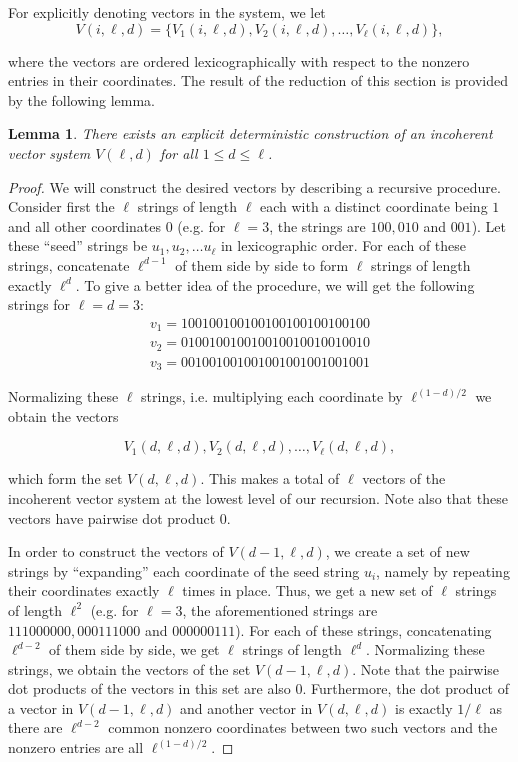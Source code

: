 \documentclass[11pt]{article}
\newtheorem{lem}[thm]{Lemma}
\begin{document}
\noindent For explicitly denoting vectors in the system, we let
$$
V(i,\ell,d) = \{V_1(i,\ell,d), V_2(i,\ell,d), \hdots, V_{\ell}(i,\ell,d)\},
$$

\noindent where the vectors are ordered lexicographically with respect to
the nonzero entries in their coordinates. The result of the
reduction of this section is provided by the following lemma.
\begin{lem}
\label{existence_1} There exists an explicit deterministic
construction of an incoherent vector system $V(\ell, d)$
for all $1 \leq d \leq \ell$.
\end{lem}

\begin{proof}
We will construct the desired vectors by describing a recursive
procedure. Consider first the $\ell$ strings of length $\ell$ each
with a distinct coordinate being $1$ and all other coordinates $0$
(e.g. for $\ell = 3$, the strings are $100, 010$ and $001$). Let
these ``seed'' strings be $u_1, u_2, \hdots u_{\ell}$ in
lexicographic order. For each of these strings, concatenate
$\ell^{d-1}$ of them side by side to form $\ell$ strings of
length exactly $\ell^d$. To give a better idea of the
procedure, we will get the following strings for $\ell = d = 3$:
\begin{eqnarray*}
v_1 = 100100100100100100100100100 \\
v_2 = 010010010010010010010010010 \\
v_3 = 001001001001001001001001001
\end{eqnarray*}

\noindent Normalizing these $\ell$ strings, i.e. multiplying
each coordinate by $\ell^{(1-d)/2}$ we obtain the vectors

$$V_1(d, \ell, d), V_2(d, \ell, d), \hdots , V_{\ell}(d, \ell, d),$$

\noindent which form the set $V(d, \ell, d)$. This makes a total of
$\ell$ vectors of the incoherent vector system at the lowest
level of our recursion. Note also that these vectors have
pairwise dot product $0$.

In order to construct the vectors of $V(d-1, \ell, d)$, we
create a set of new strings by ``expanding'' each coordinate
of the seed string $u_i$, namely by repeating their coordinates
exactly $\ell$ times in place. Thus, we get a new set of
$\ell$ strings of length $\ell^2$ (e.g. for $\ell = 3$, the
aforementioned strings are $111000000, 000111000$ and
$000000111$). For each of these strings, concatenating
$\ell^{d-2}$ of them side by side, we get $\ell$ strings of
length $\ell^d$. Normalizing these strings, we obtain the
vectors of the set $V(d-1, \ell, d)$. Note that the pairwise dot
products of the vectors in this set are also $0$. Furthermore,
the dot product of a vector in $V(d-1, \ell, d)$ and
another vector in $V(d, \ell, d)$ is exactly $1/\ell$
as there are $\ell^{d-2}$ common nonzero coordinates between
two such vectors and the nonzero entries are all $\ell^{(1-d)/2}$.


\end{proof}
\end{document}
